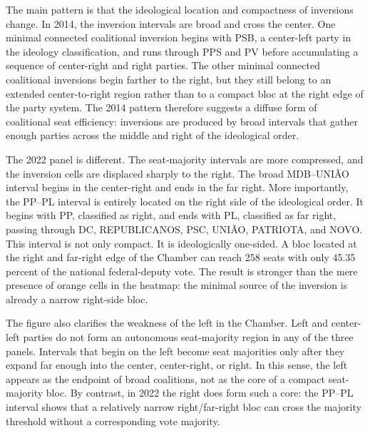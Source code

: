 \documentclass[11pt]{article}
\begin{document}
The main pattern is that the ideological location and compactness of inversions
change. In 2014, the inversion intervals are broad and cross the center. One
minimal connected coalitional inversion begins with PSB, a center-left party in
the ideology classification, and runs through PPS and PV before accumulating a
sequence of center-right and right parties. The other minimal connected
coalitional inversions begin farther to the right, but they still belong to an
extended center-to-right region rather than to a compact bloc at the right edge
of the party system. The 2014 pattern therefore suggests a diffuse form of
coalitional seat efficiency: inversions are produced by broad intervals that
gather enough parties across the middle and right of the ideological order.

The 2022 panel is different. The seat-majority intervals are more compressed,
and the inversion cells are displaced sharply to the right. The broad
MDB--UNIÃO interval begins in the center-right and ends in the far right. More
importantly, the PP--PL interval is entirely located on the right side of the
ideological order. It begins with PP, classified as right, and ends with PL,
classified as far right, passing through DC, REPUBLICANOS, PSC, UNIÃO,
PATRIOTA, and NOVO. This interval is not only compact. It is ideologically
one-sided. A bloc located at the right and far-right edge of the Chamber can
reach 258 seats with only 45.35 percent of the national federal-deputy vote.
The result is stronger than the mere presence of orange cells in the heatmap:
the minimal source of the inversion is already a narrow right-side bloc.

The figure also clarifies the weakness of the left in the Chamber. Left and
center-left parties do not form an autonomous seat-majority region in any of
the three panels. Intervals that begin on the left become seat majorities only
after they expand far enough into the center, center-right, or right. In this
sense, the left appears as the endpoint of broad coalitions, not as the core of a
compact seat-majority bloc. By contrast, in 2022 the right does form such a
core: the PP--PL interval shows that a relatively narrow right/far-right bloc can
cross the majority threshold without a corresponding vote majority.
\end{document}
